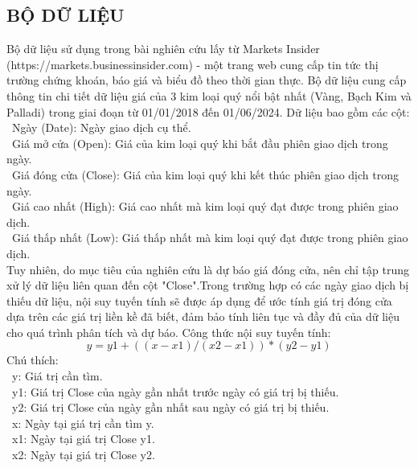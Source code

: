 \subsection{BỘ DỮ LIỆU}
Bộ dữ liệu sử dụng trong bài nghiên cứu lấy từ  Markets Insider (https://markets.businessinsider.com) - một trang web cung cấp tin tức thị trường chứng khoán, báo giá và biểu đồ theo thời gian thực. Bộ dữ liệu cung cấp thông tin chi tiết dữ liệu giá của 3 kim loại quý nổi bật nhất (Vàng, Bạch Kim và Palladi) trong giai đoạn từ 01/01/2018 đến 01/06/2024. Dữ liệu bao gồm các cột:\\
\indent\textbullet\ Ngày (Date): Ngày giao dịch cụ thể.\\
\indent\textbullet\ Giá mở cửa (Open): Giá của kim loại quý khi bắt đầu phiên giao dịch trong ngày.\\
\indent\textbullet\ Giá đóng cửa (Close): Giá của kim loại quý khi kết thúc phiên giao dịch trong ngày.\\
\indent\textbullet\ Giá cao nhất (High): Giá cao nhất mà kim loại quý đạt được trong phiên giao dịch.\\
\indent\textbullet\ Giá thấp nhất (Low): Giá thấp nhất mà kim loại quý đạt được trong phiên giao dịch.\\
Tuy nhiên, do mục tiêu của nghiên cứu là dự báo giá đóng cửa, nên chỉ tập trung xử lý dữ liệu liên quan đến cột "Close".Trong trường hợp có các ngày giao dịch bị thiếu dữ liệu, nội suy tuyến tính sẽ được áp dụng để ước tính giá trị đóng cửa dựa trên các giá trị liền kề đã biết, đảm bảo tính liên tục và đầy đủ của dữ liệu cho quá trình phân tích và dự báo. Công thức nội suy tuyến tính:\\
\[
 y = y1 + ((x - x1) / (x2 - x1)) * (y2 - y1)
\]
Chú thích:\\
\indent\textbullet\ y: Giá trị cần tìm.\\
\indent\textbullet\ y1: Giá trị Close của ngày gần nhất trước ngày có giá trị bị thiếu.\\
\indent\textbullet\ y2: Giá trị Close của ngày gần nhất sau ngày có giá trị bị thiếu.\\
\indent\textbullet\ x: Ngày tại giá trị cần tìm y.\\
\indent\textbullet\ x1: Ngày tại giá trị Close y1.\\
\indent\textbullet\ x2: Ngày tại giá trị Close y2.\\
